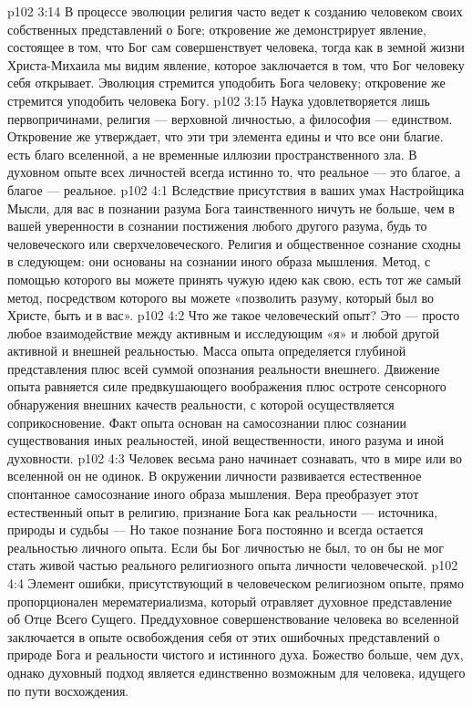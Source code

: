 \vs p102 3:14 В процессе эволюции религия часто ведет к созданию человеком своих собственных представлений о Боге; откровение же демонстрирует явление, состоящее в том, что Бог сам совершенствует человека, тогда как в земной жизни Христа\hyp{}Михаила мы видим явление, которое заключается в том, что Бог человеку себя открывает. Эволюция стремится уподобить Бога человеку; откровение же стремится уподобить человека Богу.
\vs p102 3:15 Наука удовлетворяется лишь первопричинами, религия --- верховной личностью, а философия --- единством. Откровение же утверждает, что эти три элемента едины и что все они благие.  есть благо вселенной, а не временные иллюзии пространственного зла. В духовном опыте всех личностей всегда истинно то, что реальное --- это благое, а благое --- реальное.
\vs p102 4:1 Вследствие присутствия в ваших умах Настройщика Мысли, для вас в познании разума Бога таинственного ничуть не больше, чем в вашей уверенности в сознании постижения любого другого разума, будь то человеческого или сверхчеловеческого. Религия и общественное сознание сходны в следующем: они основаны на сознании иного образа мышления. Метод, с помощью которого вы можете принять чужую идею как свою, есть тот же самый метод, посредством которого вы можете «позволить разуму, который был во Христе, быть и в вас».
\vs p102 4:2 Что же такое человеческий опыт? Это --- просто любое взаимодействие между активным и исследующим «я» и любой другой активной и внешней реальностью. Масса опыта определяется глубиной представления плюс всей суммой опознания реальности внешнего. Движение опыта равняется силе предвкушающего воображения плюс остроте сенсорного обнаружения внешних качеств реальности, с которой осуществляется соприкосновение. Факт опыта основан на самосознании плюс сознании существования иных реальностей, иной вещественности, иного разума и иной духовности.
\vs p102 4:3 Человек весьма рано начинает сознавать, что в мире или во вселенной он не одинок. В окружении личности развивается естественное спонтанное самосознание иного образа мышления. Вера преобразует этот естественный опыт в религию, признание Бога как реальности --- источника, природы и судьбы ---  Но такое познание Бога постоянно и всегда остается реальностью личного опыта. Если бы Бог личностью не был, то он бы не мог стать живой частью реального религиозного опыта личности человеческой.
\vs p102 4:4 Элемент ошибки, присутствующий в человеческом религиозном опыте, прямо пропорционален мерематериализма, который отравляет духовное представление об Отце Всего Сущего. Преддуховное совершенствование человека во вселенной заключается в опыте освобождения себя от этих ошибочных представлений о природе Бога и реальности чистого и истинного духа. Божество больше, чем дух, однако духовный подход является единственно возможным для человека, идущего по пути восхождения.
